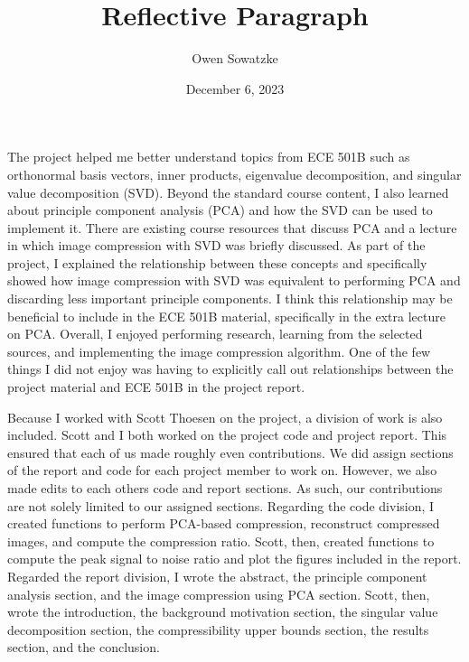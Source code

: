 \documentclass{article}
\title{Reflective Paragraph}
\author{Owen Sowatzke}
\date{December 6, 2023}
\begin{document}
	\maketitle

	The project helped me better understand topics from ECE 501B such as orthonormal basis vectors, inner products, eigenvalue decomposition, and singular value decomposition (SVD). Beyond the standard course content, I also learned about principle component analysis (PCA) and how the SVD can be used to implement it. There are existing course resources that discuss PCA and a lecture in which image compression with SVD was briefly discussed. As part of the project, I explained the relationship between these concepts and specifically showed how image compression with SVD was equivalent to performing PCA and discarding less important principle components. I think this relationship may be beneficial to include in the ECE 501B material, specifically in the extra lecture on PCA. Overall, I enjoyed performing research, learning from the selected sources, and implementing the image compression algorithm. One of the few things I did not enjoy was having to explicitly call out relationships between the project material and ECE 501B in the project report.
	
	Because I worked with Scott Thoesen on the project, a division of work is also included. Scott and I both worked on the project code and project report. This ensured that each of us made roughly even contributions. We did assign sections of the report and code for each project member to work on. However, we also made edits to each others code and report sections. As such, our contributions are not solely limited to our assigned sections. Regarding the code division, I created functions to perform PCA-based compression, reconstruct compressed images, and compute the compression ratio. Scott, then, created functions to compute the peak signal to noise ratio and plot the figures included in the report. Regarded the report division, I wrote the abstract, the principle component analysis section, and the image compression using PCA section. Scott, then, wrote the introduction, the background motivation section, the singular value decomposition section, the compressibility upper bounds section, the results section, and the conclusion.
\end{document}
